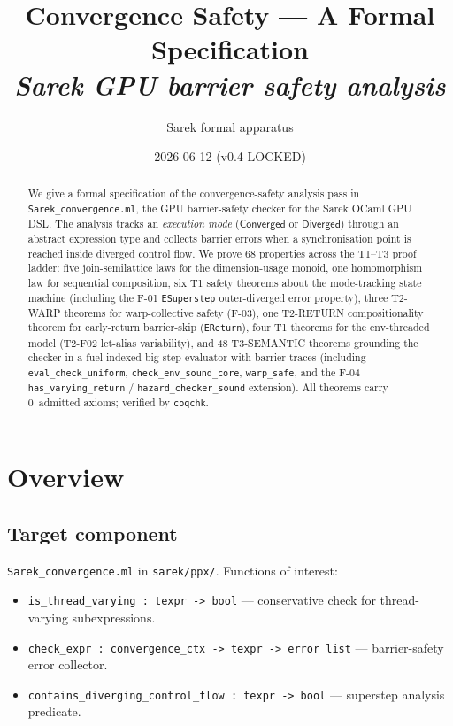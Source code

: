 \documentclass[11pt,a4paper]{article}
\title{Convergence Safety --- A Formal Specification\\
  \large \textit{Sarek GPU barrier safety analysis}}
\author{Sarek formal apparatus}
\date{2026-06-12 (v0.4 LOCKED)}
\theoremstyle{definition}
\theoremstyle{plain}
\theoremstyle{remark}
\newcommand{\Converged}{\mathsf{Converged}}
\newcommand{\Diverged}{\mathsf{Diverged}}
\begin{document}
\maketitle

\begin{abstract}
We give a formal specification of the convergence-safety analysis pass in
\texttt{Sarek\_convergence.ml}, the GPU barrier-safety checker for the Sarek
OCaml GPU DSL. The analysis tracks an \emph{execution mode} ($\Converged$ or
$\Diverged$) through an abstract expression type and collects barrier errors
when a synchronisation point is reached inside diverged control flow.
We prove 68 properties across the T1--T3 proof ladder: five join-semilattice
laws for the dimension-usage monoid, one homomorphism law for sequential
composition, six T1 safety theorems about the mode-tracking state machine
(including the F-01 \texttt{ESuperstep} outer-diverged error property), three
T2-WARP theorems for warp-collective safety (F-03), one T2-RETURN
compositionality theorem for early-return barrier-skip (\texttt{EReturn}),
four T1 theorems for the env-threaded model (T2-F02 let-alias variability),
and 48 T3-SEMANTIC theorems grounding the checker in a fuel-indexed big-step
evaluator with barrier traces (including \texttt{eval\_check\_uniform},
\texttt{check\_env\_sound\_core}, \texttt{warp\_safe}, and the F-04
\texttt{has\_varying\_return} / \texttt{hazard\_checker\_sound} extension).
All theorems carry 0~admitted axioms; verified by \texttt{coqchk}.
\end{abstract}

\section{Overview}
\label{sec:overview}

\subsection*{Target component}

\texttt{Sarek\_convergence.ml} in \texttt{sarek/ppx/}. Functions of interest:
\begin{itemize}
  \item \texttt{is\_thread\_varying : texpr -> bool} --- conservative check for
        thread-varying subexpressions.
  \item \texttt{check\_expr : convergence\_ctx -> texpr -> error list} ---
        barrier-safety error collector.
  \item \texttt{contains\_diverging\_control\_flow : texpr -> bool} ---
        superstep analysis predicate.
\end{itemize}
\end{document}
